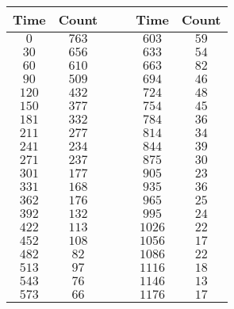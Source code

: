 \begin{tabular}{cccccc}            \toprule
Time  & Count &&& Time   & Count \\\midrule
$0$   & $763$ &&& $603$  & $59$  \\[4pt]
$30$  & $656$ &&& $633$  & $54$  \\[4pt]
$60$  & $610$ &&& $663$  & $82$  \\[4pt]
$90$  & $509$ &&& $694$  & $46$  \\[4pt]
$120$ & $432$ &&& $724$  & $48$  \\[4pt]
$150$ & $377$ &&& $754$  & $45$  \\[4pt]
$181$ & $332$ &&& $784$  & $36$  \\[4pt]
$211$ & $277$ &&& $814$  & $34$  \\[4pt]
$241$ & $234$ &&& $844$  & $39$  \\[4pt]
$271$ & $237$ &&& $875$  & $30$  \\[4pt]
$301$ & $177$ &&& $905$  & $23$  \\[4pt]
$331$ & $168$ &&& $935$  & $36$  \\[4pt]
$362$ & $176$ &&& $965$  & $25$  \\[4pt]
$392$ & $132$ &&& $995$  & $24$  \\[4pt]
$422$ & $113$ &&& $1026$ & $22$  \\[4pt]
$452$ & $108$ &&& $1056$ & $17$  \\[4pt]
$482$ & $82$  &&& $1086$ & $22$  \\[4pt]
$513$ & $97$  &&& $1116$ & $18$  \\[4pt]
$543$ & $76$  &&& $1146$ & $13$  \\[4pt]
$573$ & $66$  &&& $1176$ & $17$  \\\bottomrule
\end{tabular}

